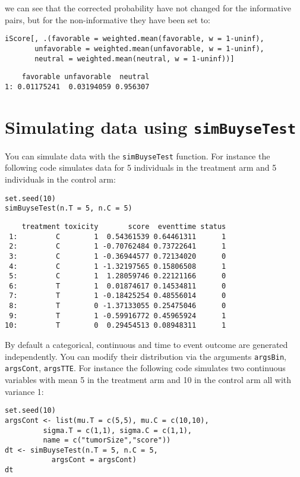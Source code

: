 \documentclass[12pt]{article}
\begin{document}
we can see that the corrected probability have not changed for the
informative pairs, but for the non-informative they have been set to:
\lstset{language=r,label= ,caption= ,captionpos=b,numbers=none}
\begin{lstlisting}
iScore[, .(favorable = weighted.mean(favorable, w = 1-uninf), 
	   unfavorable = weighted.mean(unfavorable, w = 1-uninf), 
	   neutral = weighted.mean(neutral, w = 1-uninf))]
\end{lstlisting}

\begin{verbatim}
    favorable unfavorable  neutral
1: 0.01175241  0.03194059 0.956307
\end{verbatim}

\clearpage

\section{Simulating data using \texttt{simBuyseTest}}
\label{sec:org87f01c3}
You can simulate data with the \texttt{simBuyseTest} function. For instance
the following code simulates data for 5 individuals in the treatment
arm and 5 individuals in the control arm:
\lstset{language=r,label= ,caption= ,captionpos=b,numbers=none}
\begin{lstlisting}
set.seed(10)
simBuyseTest(n.T = 5, n.C = 5)
\end{lstlisting}

\begin{verbatim}
    treatment toxicity       score  eventtime status
 1:         C        1  0.54361539 0.64461311      1
 2:         C        1 -0.70762484 0.73722641      1
 3:         C        1 -0.36944577 0.72134020      0
 4:         C        1 -1.32197565 0.15806508      1
 5:         C        1  1.28059746 0.22121166      0
 6:         T        1  0.01874617 0.14534811      0
 7:         T        1 -0.18425254 0.48556014      0
 8:         T        0 -1.37133055 0.25475046      0
 9:         T        1 -0.59916772 0.45965924      1
10:         T        0  0.29454513 0.08948311      1
\end{verbatim}

By default a categorical, continuous and time to event outcome are
generated independently. You can modify their distribution via the
arguments \texttt{argsBin}, \texttt{argsCont}, \texttt{argsTTE}. For instance the following
code simulates two continuous variables with mean 5 in the treatment
arm and 10 in the control arm all with variance 1:
\lstset{language=r,label= ,caption= ,captionpos=b,numbers=none}
\begin{lstlisting}
set.seed(10)
argsCont <- list(mu.T = c(5,5), mu.C = c(10,10), 
		 sigma.T = c(1,1), sigma.C = c(1,1),
		 name = c("tumorSize","score"))
dt <- simBuyseTest(n.T = 5, n.C = 5,
		   argsCont = argsCont)
dt
\end{lstlisting}
\end{document}
